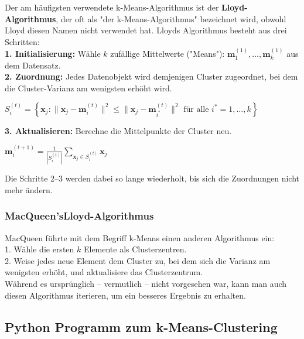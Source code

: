 \documentclass[12pt]{article}
\begin{document}
Der am häufigsten verwendete k-Means-Algorithmus ist der \textbf{Lloyd-Algorithmus}, der oft als "der k-Means-Algorithmus" bezeichnet wird, obwohl Lloyd diesen Namen nicht verwendet hat. Lloyds Algorithmus besteht aus drei Schritten:\\[0.2cm]
\textbf{1. Initialisierung:} Wähle $k$ zufällige Mittelwerte ("Means"): $ \mathbf m_1^{(1)}, \ldots, \mathbf m_k^{(1)} $ aus dem Datensatz.\\
\textbf{2. Zuordnung:} Jedes Datenobjekt wird demjenigen Cluster zugeordnet, bei dem die Cluster-Varianz am wenigsten erhöht wird.
\begin{center}
$ S_i^{(t)} = \left\{ \mathbf x_j : \big\| \mathbf x_j - \mathbf m^{(t)}_i \big\|^2 \leq \big\| \mathbf x_j - \mathbf m^{(t)}_{i^*} \big\|^2 \text{ für alle }i^*=1,\ldots,k \right\}$\\[0.2cm]
\end{center}
\textbf{3. Aktualisieren:} Berechne die Mittelpunkte der Cluster neu.
\begin{center}
$ \mathbf m_i^{(t+1)} = \frac{1}{|S_i^{(t)}|} \sum_{\mathbf x_j \in S_{i}^{(t)}} \mathbf x_j  $ \\
\end{center}
Die Schritte 2–3 werden dabei so lange wiederholt, bis sich die Zuordnungen nicht mehr ändern.

\subsubsection{MacQueen'sLloyd-Algorithmus} 

MacQueen führte mit dem Begriff k-Means einen anderen Algorithmus ein:
\\[0.3cm]1. Wähle die ersten $k$ Elemente als Clusterzentren.\\
2. Weise jedes neue Element dem Cluster zu, bei dem sich die Varianz am wenigsten erhöht, und aktualisiere das Clusterzentrum.
\\[0.3cm]Während es ursprünglich – vermutlich – nicht vorgesehen war, kann man auch diesen Algorithmus iterieren, um ein besseres Ergebnis zu erhalten.

\subsection{Python Programm zum k-Means-Clustering}

{\color{red}{***********************************************************************\\ 
Ab hier bis Ende der Section sind die Folien der Vorlesung ML  zu nutzen und diese sind in Latex umzusetzen...\\
************************************************************************}}\\[0.2cm]
\end{document}
